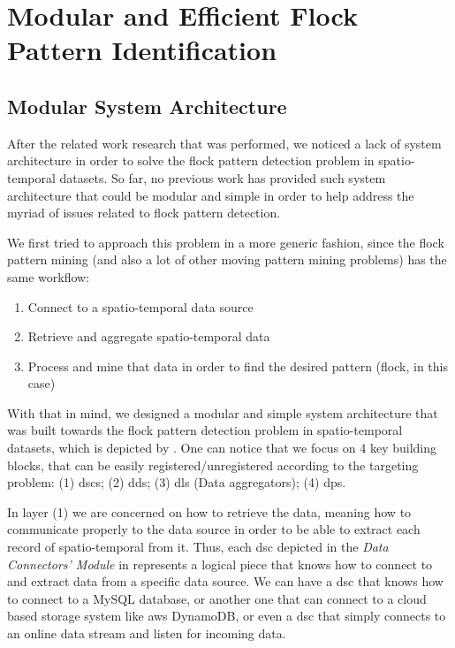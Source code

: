 \chapter{Modular and Efficient Flock Pattern Identification}
\label{chp:solution}
\section{Modular System Architecture}
\label{sec:architecture}
After the related work research that was performed, we noticed a lack of system architecture in order to solve the flock
pattern detection problem in spatio-temporal datasets. So far, no previous work has provided such system architecture
that could be modular and simple in order to help address the myriad of issues related to flock pattern detection.

We first tried to approach this problem in a more generic fashion, since the flock pattern mining (and also a lot of
other moving pattern mining problems) has the same workflow:

\begin{enumerate}
    \item Connect to a spatio-temporal data source
    \item Retrieve and aggregate spatio-temporal data
    \item Process and mine that data in order to find the desired pattern (flock, in this case)
\end{enumerate}

With that in mind, we designed a modular and simple system architecture that was built towards the flock pattern
detection problem in spatio-temporal datasets, which is depicted by . One can notice that we
focus on 4 key building blocks, that can be easily registered/unregistered according to the targeting problem: (1)
\acp{dsc}; (2) \acp{dd}; (3) \acp{dl} (Data aggregators); (4) \acp{dp}.

In layer (1) we are concerned on how to retrieve the data, meaning how to communicate properly to the data source in
order to be able to extract each record of spatio-temporal from it. Thus, each \ac{dsc} depicted in the \textit{Data
Connectors' Module} in  represents a logical piece that knows how to connect to and extract
data from a specific data source. We can have a \ac{dsc} that knows how to connect to a MySQL database, or another one
that can connect to a cloud based storage system like \ac{aws} DynamoDB, or even a \ac{dsc} that simply connects to an
online data stream and listen for incoming data.

